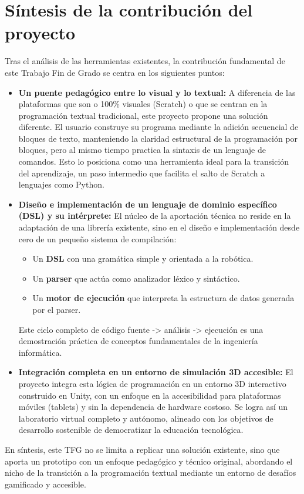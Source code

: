 \section{Síntesis de la contribución del proyecto}
Tras el análisis de las herramientas existentes, la contribución fundamental de este Trabajo Fin de Grado se centra en los siguientes puntos:

\begin{itemize}
	\item \textbf{Un puente pedagógico entre lo visual y lo textual:} A diferencia de las plataformas que son o 100\% visuales (Scratch) o que se centran en la programación textual tradicional, este proyecto propone una solución diferente. El usuario construye su programa mediante la adición secuencial de bloques de texto, manteniendo la claridad estructural de la programación por bloques, pero al mismo tiempo practica la sintaxis de un lenguaje de comandos. Esto lo posiciona como una herramienta ideal para la transición del aprendizaje, un paso intermedio que facilita el salto de Scratch a lenguajes como Python.
	
	\item \textbf{Diseño e implementación de un lenguaje de dominio específico (DSL) y su intérprete:} El núcleo de la aportación técnica no reside en la adaptación de una librería existente, sino en el diseño e implementación desde cero de un pequeño sistema de compilación:
	\begin{itemize}
		\item Un \textbf{DSL} con una gramática simple y orientada a la robótica.
		\item Un \textbf{parser} que actúa como analizador léxico y sintáctico.
		\item Un \textbf{motor de ejecución} que interpreta la estructura de datos generada por el parser.
	\end{itemize}
	Este ciclo completo de código fuente -> análisis -> ejecución es una demostración práctica de conceptos fundamentales de la ingeniería informática.
	
	\item \textbf{Integración completa en un entorno de simulación 3D accesible:} El proyecto integra esta lógica de programación en un entorno 3D interactivo construido en Unity, con un enfoque en la accesibilidad para plataformas móviles (tablets) y sin la dependencia de hardware costoso. Se logra así un laboratorio virtual completo y autónomo, alineado con los objetivos de desarrollo sostenible de democratizar la educación tecnológica.
	
\end{itemize}
En síntesis, este TFG no se limita a replicar una solución existente, sino que aporta un prototipo con un enfoque pedagógico y técnico original, abordando el nicho de la transición a la programación textual mediante un entorno de desafíos gamificado y accesible.
